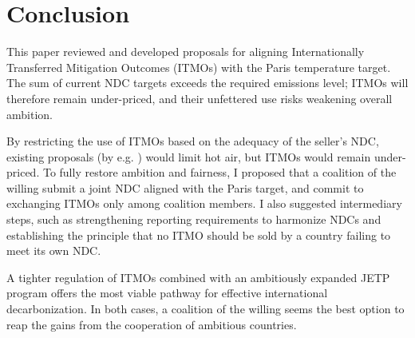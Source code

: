 \documentclass[12pt,english]{article}
\begin{document}
\section{Conclusion\label{sec:conclusion}}

This paper reviewed and developed proposals for aligning Internationally Transferred Mitigation Outcomes (ITMOs) with the Paris temperature target. The sum of current NDC targets exceeds the required emissions level; ITMOs will therefore remain under-priced, and their unfettered use risks weakening overall ambition.

By restricting the use of ITMOs based on the adequacy of the seller's NDC, existing proposals (by e.g. \citealp{michaelowa_additionality_2019}) would limit hot air, but ITMOs would remain under-priced. To fully restore ambition and fairness, I proposed that a coalition of the willing submit a joint NDC aligned with the Paris target, and commit to exchanging ITMOs only among coalition members. I also suggested intermediary steps, such as strengthening reporting requirements to harmonize NDCs and establishing the principle that no ITMO should be sold by a country failing to meet its own NDC.

A tighter regulation of ITMOs combined with an ambitiously expanded JETP program \citep{steckel_climate_2017,bolton_why_2025} offers the most viable pathway for effective international decarbonization. In both cases, a coalition of the willing seems the best option to reap the gains from the cooperation of ambitious countries. 



\end{document}
